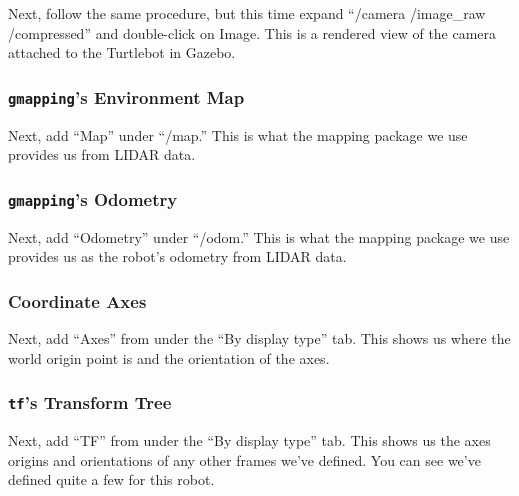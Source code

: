 \documentclass{article}
\begin{document}


Next, follow the same procedure, but this time expand ``/camera /image\_raw /compressed'' and double-click on Image. This is a rendered view of the camera attached to the Turtlebot in Gazebo.

\subsubsection{\texttt{gmapping}'s Environment Map}

Next, add ``Map'' under ``/map.'' This is what the mapping package we use provides us from LIDAR data.

\subsubsection{\texttt{gmapping}'s Odometry}

Next, add ``Odometry'' under ``/odom.'' This is what the mapping package we use provides us as the robot's odometry from LIDAR data.

\subsubsection{Coordinate Axes}

Next, add ``Axes'' from under the ``By display type'' tab. This shows us where the world origin point is and the orientation of the axes.

\subsubsection{\texttt{tf}'s Transform Tree}

Next, add ``TF'' from under the ``By display type'' tab. This shows us the axes origins and orientations of any other frames we've defined. You can see we've defined quite a few for this robot.

\end{document}
